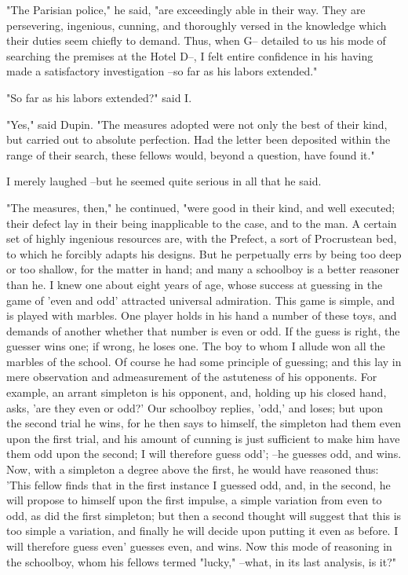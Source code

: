 \documentclass{article}
\begin{document}
"The Parisian police," he said, "are exceedingly able in their way. They are persevering, ingenious, cunning, and thoroughly versed in the knowledge which their duties seem chiefly to demand. Thus, when G-- detailed to us his mode of searching the premises at the Hotel D--, I felt entire confidence in his having made a satisfactory investigation --so far as his labors extended."

"So far as his labors extended?" said I.

"Yes," said Dupin. "The measures adopted were not only the best of their kind, but carried out to absolute perfection. Had the letter been deposited within the range of their search, these fellows would, beyond a question, have found it."

I merely laughed --but he seemed quite serious in all that he said.

"The measures, then," he continued, "were good in their kind, and well executed; their defect lay in their being inapplicable to the case, and to the man. A certain set of highly ingenious resources are, with the Prefect, a sort of Procrustean bed, to which he forcibly adapts his designs. But he perpetually errs by being too deep or too shallow, for the matter in hand; and many a schoolboy is a better reasoner than he. I knew one about eight years of age, whose success at guessing in the game of 'even and odd' attracted universal admiration. This game is simple, and is played with marbles. One player holds in his hand a number of these toys, and demands of another whether that number is even or odd. If the guess is right, the guesser wins one; if wrong, he loses one. The boy to whom I allude won all the marbles of the school. Of course he had some principle of guessing; and this lay in mere observation and admeasurement of the astuteness of his opponents. For example, an arrant simpleton is his opponent, and, holding up his closed hand, asks, 'are they even or odd?' Our schoolboy replies, 'odd,' and loses; but upon the second trial he wins, for he then says to himself, the simpleton had them even upon the first trial, and his amount of cunning is just sufficient to make him have them odd upon the second; I will therefore guess odd'; --he guesses odd, and wins. Now, with a simpleton a degree above the first, he would have reasoned thus: 'This fellow finds that in the first instance I guessed odd, and, in the second, he will propose to himself upon the first impulse, a simple variation from even to odd, as did the first simpleton; but then a second thought will suggest that this is too simple a variation, and finally he will decide upon putting it even as before. I will therefore guess even' guesses even, and wins. Now this mode of reasoning in the schoolboy, whom his fellows termed "lucky," --what, in its last analysis, is it?"
\end{document}
